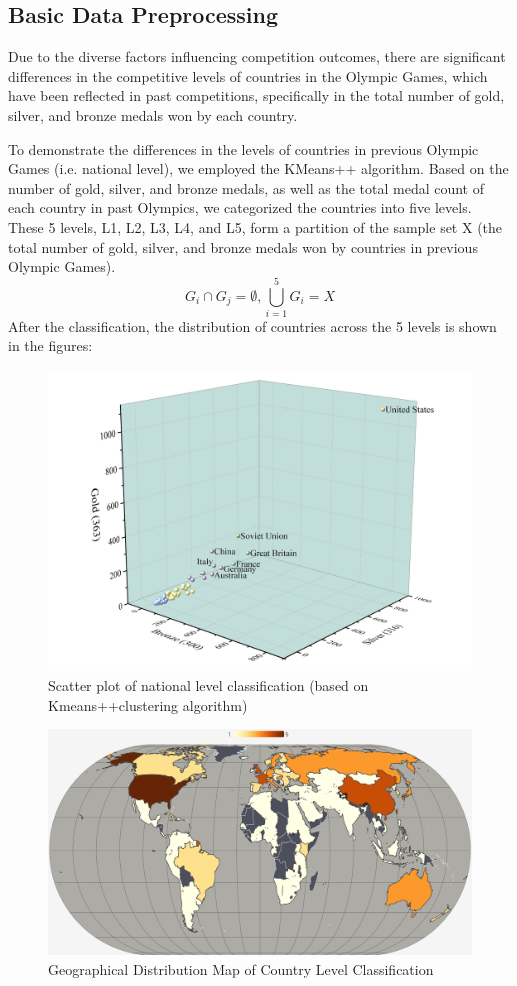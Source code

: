 \documentclass[12pt]{article}  %
\begin{document}
\subsection{Basic Data Preprocessing}
Due to the diverse factors influencing competition outcomes, there are significant differences in the competitive levels of countries in the Olympic Games, which have been reflected in past competitions, specifically in the total number of gold, silver, and bronze medals won by each country. 

To demonstrate the differences in the levels of countries in previous Olympic Games (i.e. national level), we employed the KMeans++ algorithm. Based on the number of gold, silver, and bronze medals, as well as the total medal count of each country in past Olympics, we categorized the countries into five levels. These 5 levels, L1, L2, L3, L4, and L5, form a partition of the sample set X (the total number of gold, silver, and bronze medals won by countries in previous Olympic Games).
\begin{equation}
G_{i} \cap G_{j}=\emptyset, \bigcup_{i=1}^{5} G_{i}=X
\end{equation}
After the classification, the distribution of countries across the 5 levels is shown in the figures:
\begin{figure}[H]
	\centering
	\includegraphics[width=12cm]{img/Level1.png}
	\caption{Scatter plot of national level classification (based on Kmeans++clustering algorithm)}
	\label{fig:aa}
\end{figure}

\begin{figure}[H]
	\centering
	\includegraphics[width=12cm]{img/Level2.png}
	\caption{Geographical Distribution Map of Country Level Classification}
	\label{fig:aa}
\end{figure}
\end{document}

